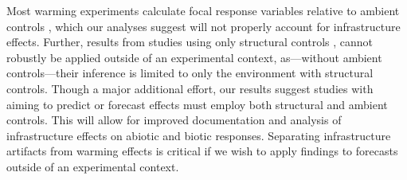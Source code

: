 \documentclass{article}
\begin{document}
\par Most warming experiments calculate focal response variables relative to ambient controls \citep [e.g.,][]{price1998,dunne2003,cleland2006,morin2010,marchin2015}, which our analyses suggest will not properly account for infrastructure effects. Further, results from studies using only structural controls \citep [e.g.,][]{sherry2007,hoeppner2012, rollinson2012}, cannot robustly be applied outside of an experimental context, as---without ambient controls---their inference is limited to only the environment with structural controls. Though a major additional effort, our results suggest studies with aiming to predict or forecast effects must employ both structural and ambient controls. This will allow for improved documentation and analysis of infrastructure effects on abiotic and biotic responses. Separating infrastructure artifacts from warming effects is critical if we wish to apply findings to forecasts outside of an experimental context. 
\end{document}
